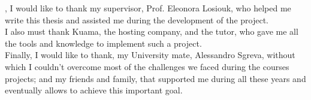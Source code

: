 
, I would like to thank my supervisor, Prof. Eleonora Losiouk, who helped me write this thesis and assisted me during the development of the project. \\
I also must thank Kuama, the hosting company, and the tutor, who gave me all the tools and knowledge to implement such a project. \\
Finally, I would like to thank, my University mate, Alessandro Sgreva, without which I couldn't overcome most of the challenges we faced during the courses projects; and my friends and family, that supported me during all these years and eventually allows to achieve this important goal.